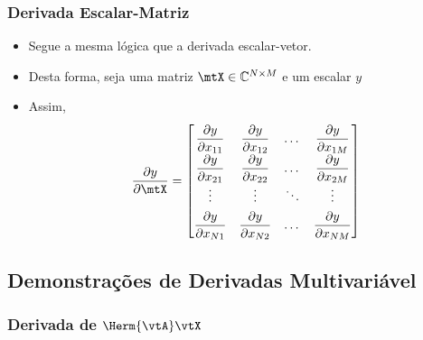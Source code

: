 \begin{frame}
	\frametitle{\normalsize Derivada Escalar-Matriz}
	\begin{itemize}
		\item Segue a mesma lógica que a derivada escalar-vetor.
		\item Desta forma, seja uma matriz $\mtX \in \mathbb{C}^{N \times M}$ e um escalar $y$
		\item Assim,
		\[\renewcommand{\arraystretch}{1.8}
			\dfrac{\partial y}{\partial \mtX} = \begin{bmatrix}
				\dfrac{\partial y}{\partial x_{11}} & \dfrac{\partial y}{\partial x_{12}} & \dots & \dfrac{\partial y}{\partial x_{1M}} \\
				\dfrac{\partial y}{\partial x_{21}} & \dfrac{\partial y}{\partial x_{22}} & \dots & \dfrac{\partial y}{\partial x_{2M}} \\
				\vdots & \vdots & \ddots & \vdots \\
				\dfrac{\partial y}{\partial x_{N1}} & \dfrac{\partial y}{\partial x_{N2}} & \dots & \dfrac{\partial y}{\partial x_{NM}} \\
			\end{bmatrix}
		\]
	\end{itemize}
\end{frame}

\subsection{Demonstrações de Derivadas Multivariável}
\subsubsection{Derivada de $\Herm{\vtA} \vtX$}

